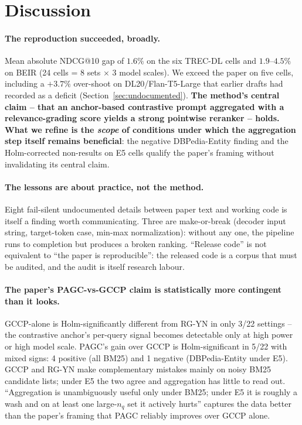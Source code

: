 \documentclass[sigconf]{acmart}
\begin{document}
\section{Discussion}
\label{sec:discussion}

\paragraph{The reproduction succeeded, broadly.} Mean absolute
NDCG@10 gap of $1.6\%$ on the six TREC-DL cells and $1.9$--$4.5\%$
on BEIR (24 cells = 8 sets $\times$ 3 model scales). We exceed
the paper on five cells, including a $+3.7\%$ over-shoot on
DL20/Flan-T5-Large that earlier drafts had recorded as a deficit
(Section~\ref{sec:undocumented}). \textbf{The method's central
claim -- that an anchor-based contrastive prompt aggregated with
a relevance-grading score yields a strong pointwise reranker --
holds. What we refine is the \emph{scope} of conditions under
which the aggregation step itself remains beneficial}: the negative
DBPedia-Entity finding and the Holm-corrected non-results on E5
cells qualify the paper's framing without invalidating its central
claim.

\paragraph{The lessons are about practice, not the method.}
Eight fail-silent undocumented details between paper text and
working code is itself a finding worth communicating. Three are
make-or-break (decoder input string, target-token case, min-max
normalization): without any one, the pipeline runs to completion
but produces a broken ranking. ``Release code'' is not equivalent
to ``the paper is reproducible'': the released code is a corpus
that must be audited, and the audit is itself research labour.

\paragraph{The paper's PAGC-vs-GCCP claim is statistically more
contingent than it looks.} GCCP-alone is Holm-significantly
different from RG-YN in only 3/22 settings -- the contrastive
anchor's per-query signal becomes detectable only at high power or
high model scale. PAGC's gain over GCCP is Holm-significant in
5/22 with mixed signs: 4 positive (all BM25) and 1 negative
(DBPedia-Entity under E5). GCCP and RG-YN make complementary
mistakes mainly on noisy BM25 candidate lists; under E5 the two
agree and aggregation has little to read out. ``Aggregation is
unambiguously useful only under BM25; under E5 it is roughly a
wash and on at least one large-$n_q$ set it actively hurts''
captures the data better than the paper's framing that PAGC
reliably improves over GCCP alone.
\end{document}
